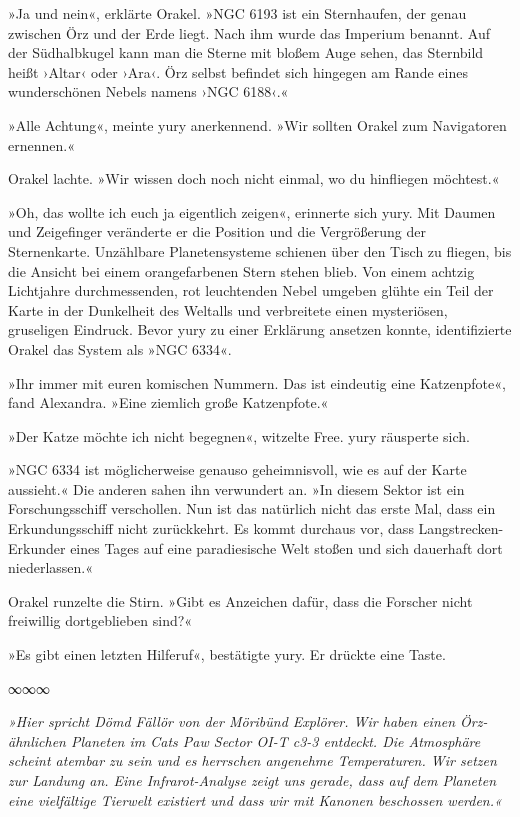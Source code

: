 »Ja und nein«, erklärte Orakel. »NGC 6193 ist ein Sternhaufen, der genau zwischen Örz und der Erde liegt. Nach ihm wurde das Imperium benannt. Auf der Südhalbkugel kann man die Sterne mit bloßem Auge sehen, das Sternbild heißt ›Altar‹ oder ›Ara‹. Örz selbst befindet sich hingegen am Rande eines wunderschönen Nebels namens ›NGC 6188‹.«

»Alle Achtung«, meinte yury anerkennend. »Wir sollten Orakel zum Navigatoren ernennen.«

Orakel lachte. »Wir wissen doch noch nicht einmal, wo du hinfliegen möchtest.«

»Oh, das wollte ich euch ja eigentlich zeigen«, erinnerte sich yury. Mit Daumen und Zeigefinger veränderte er die Position und die Vergrößerung der Sternenkarte. Unzählbare Planetensysteme schienen über den Tisch zu fliegen, bis die Ansicht bei einem orangefarbenen Stern stehen blieb. Von einem achtzig Lichtjahre durchmessenden, rot leuchtenden Nebel umgeben glühte ein Teil der Karte in der Dunkelheit des Weltalls und verbreitete einen mysteriösen, gruseligen Eindruck. Bevor yury zu einer Erklärung ansetzen konnte, identifizierte Orakel das System als »NGC 6334«.

\cleardoubleevenpage



»Ihr immer mit euren komischen Nummern. Das ist eindeutig eine Katzenpfote«, fand Alexandra. »Eine ziemlich große Katzenpfote.«

»Der Katze möchte ich nicht begegnen«, witzelte Free. yury räusperte sich.

»NGC 6334 ist möglicherweise genauso geheimnisvoll, wie es auf der Karte aussieht.« Die anderen sahen ihn verwundert an. »In diesem Sektor ist ein Forschungsschiff verschollen. Nun ist das natürlich nicht das erste Mal, dass ein Erkundungsschiff nicht zurückkehrt. Es kommt durchaus vor, dass Langstrecken-Erkunder eines Tages auf eine paradiesische Welt stoßen und sich dauerhaft dort niederlassen.«

Orakel runzelte die Stirn. »Gibt es Anzeichen dafür, dass die Forscher nicht freiwillig dortgeblieben sind?«

»Es gibt einen letzten Hilferuf«, bestätigte yury. Er drückte eine Taste.

\begin{center}
    ∞∞∞
\end{center}

\textit{»Hier spricht Dömd Fällör von der Möribünd Explörer. Wir haben einen Örz-ähnlichen Planeten im Cats Paw Sector OI-T c3-3 entdeckt. Die Atmosphäre scheint atembar zu sein und es herrschen angenehme Temperaturen. Wir setzen zur Landung an. Eine Infrarot-Analyse zeigt uns gerade, dass auf dem Planeten eine vielfältige Tierwelt existiert und dass wir mit Kanonen beschossen werden.«}


